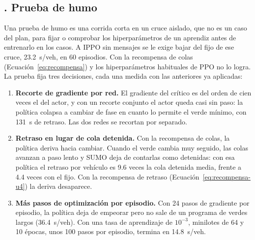 \subsection*{\theanexoIapartado. Prueba de humo}
\label{sec:humo}

Una prueba de humo es una corrida corta en un cruce aislado, que no es
un caso del plan, para fijar o comprobar los hiperparámetros de un
aprendiz antes de entrenarlo en los casos. A IPPO sin mensajes se le
exige bajar del fijo de ese cruce, 23.2~s/veh, en 60 episodios. Con la
recompensa de colas (Ecuación~\ref{eq:recompensa}) y los
hiperparámetros habituales de PPO no lo logra. La prueba fija tres
decisiones, cada una medida con las anteriores ya aplicadas:

\begin{enumerate}
  \item \textbf{Recorte de gradiente por red.} El gradiente del crítico
    es del orden de cien veces el del actor, y con un recorte conjunto
    el actor queda casi sin paso: la política colapsa a cambiar de fase
    en cuanto lo permite el verde mínimo, con 131~s de retraso. Las dos
    redes se recortan por separado.
  \item \textbf{Retraso en lugar de cola detenida.} Con la recompensa
    de colas, la política deriva hacia cambiar. Cuando el verde cambia
    muy seguido, las colas avanzan a paso lento y SUMO deja de contarlas
    como detenidas: con esa política el retraso por vehículo es 9.6
    veces la cola detenida media, frente a 4.4 veces con el fijo. Con la
    recompensa de retraso (Ecuación~\ref{eq:recompensa-u4}) la deriva
    desaparece.
  \item \textbf{Más pasos de optimización por episodio.} Con 24 pasos
    de gradiente por episodio, la política deja de empeorar pero no sale
    de un programa de verdes largos (36.4~s/veh). Con una tasa de
    aprendizaje de $10^{-3}$, minilotes de 64 y 10 épocas, unos 100
    pasos por episodio, termina en 14.8~s/veh.
\end{enumerate}


